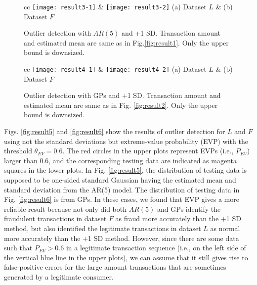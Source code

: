 \documentclass[final,authoryear,5p,times,twocolumn]{elsarticle}
\begin{document}
\begin{figure}[h!]
\begin{tabular}{cc}
\texttt{[image: result3-1]} & \texttt{[image: result3-2]} \cr
(a) Dataset $L$ &
(b) Dataset $F$
\end{tabular}
\caption{Outlier detection with $AR(5)$ and +1 SD. Transaction amount and estimated mean are same as in Fig.\ref{fig:result1}. Only the upper bound is downsized.}
\label{fig:result3}
\end{figure}

\begin{figure}[h!]
\begin{tabular}{cc}
\texttt{[image: result4-1]} & \texttt{[image: result4-2]} \cr
(a) Dataset $L$ &
(b) Dataset $F$
\end{tabular}
\caption{Outlier detection with GPs and +1 SD. Transaction amount and estimated mean are same as in Fig. \ref{fig:result2}. Only the upper bound is downsized.}
\label{fig:result4}
\end{figure}

Figs. \ref{fig:result5} and \ref{fig:result6} show the results of outlier detection for $L$ and $F$ using not the standard deviations but extreme-value probability (EVP) with the threshold $\theta_{EV} =0.6$. The red circles in the upper plots represent EVPs (i.e., $P_{EV}$) larger than 0.6, and the corresponding testing data are indicated as magenta squares in the lower plots. In Fig. \ref{fig:result5}, the distribution of testing data is supposed to be one-sided standard Gaussian having the estimated mean and standard deviation from the AR(5) model. The distribution of testing data in Fig. \ref{fig:result6} is from GPs. In these cases, we found that EVP gives a more reliable result because not only did both $AR(5)$ and GPs identify the fraudulent transactions in dataset $F$ as fraud more accurately than the +1 SD method, but also identified the legitimate transactions in dataset $L$ as normal more accurately than the +1 SD method. However, since there are some data such that $P_{EV}>0.6$ in a legitimate transaction sequence (i.e., on the left side of the vertical blue line in the upper plots), we can assume that it still gives rise to false-positive errors for the large amount transactions that are sometimes generated by a legitimate consumer.
\end{document}
